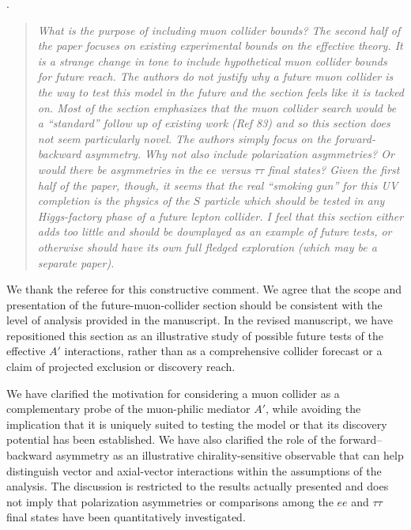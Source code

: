 \documentclass[12pt,a4paper]{article}
\begin{document}
\medskip
{}.
\begin{quote}\itshape
What is the purpose of including muon collider bounds? The second half of the paper focuses on existing experimental bounds on the effective theory. It is a strange change in tone to include hypothetical muon collider bounds for future reach. The authors do not justify why a future muon collider is the way to test this model in the future and the section feels like it is tacked on. Most of the section emphasizes that the muon collider search would be a ``standard'' follow up of existing work (Ref 83) and so this section does not seem particularly novel. The authors simply focus on the forward-backward asymmetry. Why not also include polarization asymmetries? Or would there be asymmetries in the \(ee\) versus \(\tau\tau\) final states? Given the first half of the paper, though, it seems that the real ``smoking gun'' for this UV completion is the physics of the \(S\) particle which should be tested in any Higgs-factory phase of a future lepton collider. I feel that this section either adds too little and should be downplayed as an example of future tests, or otherwise should have its own full fledged exploration (which may be a separate paper).
\end{quote}


We thank the referee for this constructive comment. We agree that the scope and presentation of the future-muon-collider section should be consistent with the level of analysis provided in the manuscript. In the revised manuscript, we have repositioned this section as an illustrative study of possible future tests of the effective \(A'\) interactions, rather than as a comprehensive collider forecast or a claim of projected exclusion or discovery reach.

We have clarified the motivation for considering a muon collider as a complementary probe of the muon-philic mediator \(A'\), while avoiding the implication that it is uniquely suited to testing the model or that its discovery potential has been established. We have also clarified the role of the forward--backward asymmetry as an illustrative chirality-sensitive observable that can help distinguish vector and axial-vector interactions within the assumptions of the analysis. The discussion is restricted to the results actually presented and does not imply that polarization asymmetries or comparisons among the \(ee\) and \(\tau\tau\) final states have been quantitatively investigated.
\end{document}
